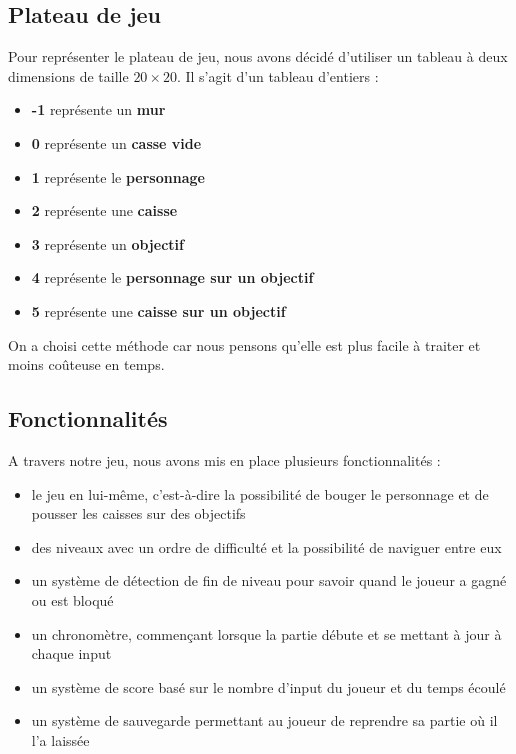 \documentclass[12pt,french]{article}
\begin{document}
\subsection{Plateau de jeu}

Pour représenter le plateau de jeu, nous avons décidé d'utiliser un tableau à deux dimensions de taille $20\times20$. Il s'agit d'un tableau d'entiers :
\begin{itemize}
    \item \textbf{-1} représente un \textbf{mur}
    \item \textbf{0} représente un \textbf{casse vide}
    \item \textbf{1} représente le \textbf{personnage}
    \item \textbf{2} représente une \textbf{caisse}
    \item \textbf{3} représente un \textbf{objectif}
    \item \textbf{4} représente le \textbf{personnage sur un objectif}
    \item \textbf{5} représente une \textbf{caisse sur un objectif}\\
   
\end{itemize}
On a choisi cette méthode car nous pensons qu'elle est plus facile à traiter et moins coûteuse en temps.

\subsection{Fonctionnalités}

A travers notre jeu, nous avons mis en place plusieurs fonctionnalités :\\
\begin{itemize}
    \item le jeu en lui-même, c'est-à-dire la possibilité de bouger le personnage et de pousser les caisses sur des objectifs
    \item des niveaux avec un ordre de difficulté et la possibilité de naviguer entre eux
    \item un système de détection de fin de niveau pour savoir quand le joueur a gagné ou est bloqué
    \item un chronomètre, commençant lorsque la partie débute et se mettant à jour à chaque input
    \item un système de score basé sur le nombre d'input du joueur et du temps écoulé
    \item un système de sauvegarde permettant au joueur de reprendre sa partie où il l'a laissée\\
   
\end{itemize}
\end{document}
